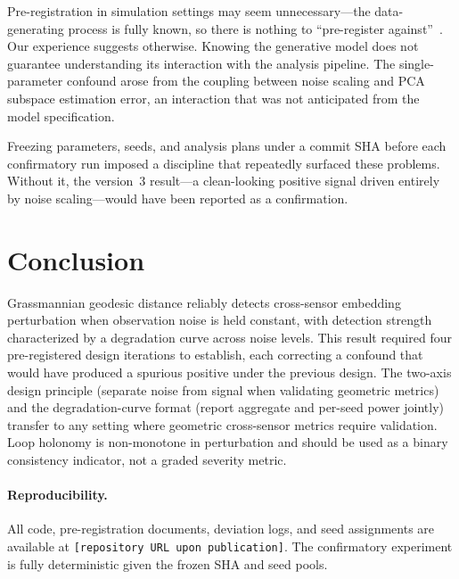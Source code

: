 \documentclass[11pt]{article}
\begin{document}
Pre-registration in simulation settings may seem
unnecessary---the data-generating process is fully known, so there
is nothing to ``pre-register
against''~\citep{simmons2011false}.  Our experience suggests
otherwise.  Knowing the generative model does not guarantee
understanding its interaction with the analysis pipeline.  The
single-parameter confound arose from the coupling between noise
scaling and PCA subspace estimation error, an interaction that was
not anticipated from the model specification.

Freezing parameters, seeds, and analysis plans under a commit SHA
before each confirmatory run imposed a discipline that repeatedly
surfaced these problems.  Without it, the version~3 result---a
clean-looking positive signal driven entirely by noise
scaling---would have been reported as a confirmation.

\section{Conclusion}
\label{sec:conclusion}

Grassmannian geodesic distance reliably detects cross-sensor
embedding perturbation when observation noise is held constant,
with detection strength characterized by a degradation curve across
noise levels.  This result required four pre-registered design
iterations to establish, each correcting a confound that would have
produced a spurious positive under the previous design.  The
two-axis design principle (separate noise from signal when
validating geometric metrics) and the degradation-curve format
(report aggregate and per-seed power jointly) transfer to any
setting where geometric cross-sensor metrics require validation.
Loop holonomy is non-monotone in perturbation and should be used
as a binary consistency indicator, not a graded severity metric.

\paragraph{Reproducibility.}
All code, pre-registration documents, deviation logs, and seed
assignments are available at
\texttt{[repository URL upon publication]}.  The confirmatory
experiment is fully deterministic given the frozen SHA and seed
pools.



\end{document}
